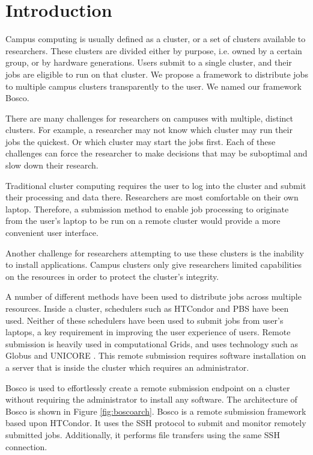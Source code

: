 \label{chapter:campusjobs} 
\section{Introduction}

Campus computing is usually defined as a cluster, or a set of clusters available to researchers.  These clusters are divided either by purpose, i.e. owned by a certain group, or by hardware generations.  Users submit to a single cluster, and their jobs are eligible to run on that cluster.  We propose a framework to distribute jobs to multiple campus clusters transparently to the user.  We named our framework Bosco.  

There are many challenges for researchers on campuses with multiple, distinct clusters.  For example, a researcher may not know which cluster may run their jobs the quickest.  Or which cluster may start the jobs first.  Each of these challenges can force the researcher to make decisions that may be suboptimal and slow down their research.

Traditional cluster computing requires the user to log into the cluster and submit their processing and data there. Researchers are most comfortable on their own laptop.  Therefore, a submission method to enable job processing to originate from the user's laptop to be run on a remote cluster would provide a more convenient user interface.

Another challenge for researchers attempting to use these clusters is the inability to install applications.  Campus clusters only give researchers limited capabilities on the resources in order to protect the cluster's integrity.

A number of different methods have been used to distribute jobs across multiple resources.  Inside a cluster, schedulers such as HTCondor  \cite{litzkow1988condor} and PBS \cite{henderson1995job} have been used.  Neither of these schedulers have been used to submit jobs from user's laptops, a key requirement in improving the user experience of users.  Remote submission is heavily used in computational Grids, and uses technology such as Globus \cite{foster2001globus} and UNICORE \cite{romberg2002unicore}. This remote submission requires software installation on a server that is inside the cluster which requires an administrator.

Bosco \cite{weitzel2014accessing} is used to effortlessly create a remote submission endpoint on a cluster without requiring the administrator to install any software.  The architecture of Bosco is shown in Figure \ref{fig:boscoarch}.  Bosco is a remote submission framework based upon HTCondor.  It uses the SSH \cite{ylonen2006secure} protocol to submit and monitor remotely submitted jobs.  Additionally, it performs file transfers using the same SSH connection.

